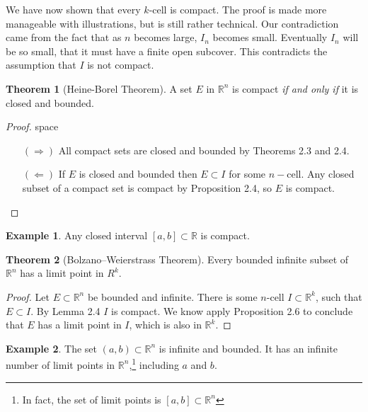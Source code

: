 \documentclass{article}
\newcommand{\R}{\mathbb{R}}
\theoremstyle{definition}
\newtheorem{theorem}{Theorem}[section]
\newtheorem{example}{Example}[section]
\begin{document}
We have now shown that every $ k $-cell is compact. The proof is made more manageable with illustrations, but is still rather technical. Our contradiction came from the fact that as $ n $ becomes large, $ I_n $ becomes small. Eventually $ I_n $ will be so small, that it must have a finite open subcover. This contradicts the assumption that $ I $ is not compact. 
\begin{theorem}[Heine-Borel Theorem]
	A set $ E $ in $ \R^n $ is compact \textit{if and only if} it is closed and bounded.
\end{theorem} 
\begin{proof}{\color{white}space}
\begin{enumerate}
	\item [$ (\Longrightarrow) $] All compact sets are closed and bounded by Theorems 2.3 and 2.4. 
	\item [$ (\Longleftarrow) $] If $ E $ is closed and bounded then $ E\subset I $ for some $ n -$cell. Any closed subset of a compact set is compact by Proposition 2.4, so $ E $ is compact.
\end{enumerate}
\end{proof}
\begin{example}
	Any closed interval $ [a,b]\subset \R$ is compact. 
\end{example}
\begin{theorem}[Bolzano–Weierstrass Theorem]
	Every bounded infinite subset of $ \R^n $ has a limit point in $ R^k $. 
\end{theorem}
\begin{proof}
	Let $ E\subset\R^n $ be bounded and infinite. There is some $ n $-cell $ I\subset\R^k $, such that $ E\subset I $. By Lemma 2.4 $ I $ is compact. We know apply Proposition 2.6 to conclude that $ E $ has a limit point in $ I $, which is also in $ \R^k $.
\end{proof}
\begin{example}
	The set $ (a,b)\subset\R^n $ is infinite and bounded. It has an infinite number of limit points in $ \R^n $,\footnote{In fact, the set of limit points is $ [a,b]\subset\R^n $} including $ a $ and $ b $.
\end{example}
\end{document}

